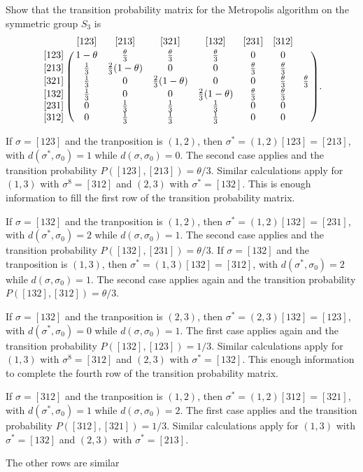 \documentclass[12pt]{article}
\begin{document}
\begin{exercise}
    Show that the transition probability matrix for the Metropolis
    algorithm on the symmetric group \( S_3 \) is
    \[
        \bordermatrix{ & [123] & [213] & [321] & [132] & [231] & [312]
        \cr
        [123] & 1-\theta & \frac{\theta}{3} & \frac{\theta}{3} & \frac{\theta}
        {3} & 0 & 0 \cr
        [213] & \frac{1}{3} & \frac{2}{3}(1-\theta) & 0 & 0 & \frac{\theta}
        {3} & \frac {\theta}{3} \cr
        [321] & \frac{1}{3} & 0 & \frac{2}{3}(1-\theta) & 0 & 0 & \frac{\theta}
        {3} & \frac{\theta}{3} \cr
        [132] & \frac{1}{3} & 0 & 0 & \frac{2}{3}(1-\theta) & \frac{\theta}
        {3} & \frac{\theta}{3} \cr
        [231] & 0 & \frac{1}{3} & \frac{1}{3} & \frac{1}{3} & 0 & 0 \cr
        [312] & 0 & \frac{1}{3} & \frac{1}{3} & \frac{1}{3} & 0 & 0 \cr
        }.
    \]
\end{exercise}
\begin{solution}
    If \( \sigma = [123] \) and the tranposition is \( (1,2) \), then \(
    \sigma^{*} = (1,2)[123] = [213] \), with \( d(\sigma^{*}, \sigma_0)
    = 1 \) while \( d(\sigma,\sigma_0) = 0 \).  The second case applies
    and the transition probability \( P([123], [213]) = \theta/3 \).
    Similar calculations apply for \( (1,3) \) with \( \sigma^8 = [312] \)
    and \( (2,3) \) with \( \sigma^* = [132] \).  This is enough
    information to fill the first row of the transition probability
    matrix.

    If \( \sigma = [132] \) and the tranposition is \( (1,2) \), then \(
    \sigma^{*} = (1,2)[132] = [231] \), with \( d(\sigma^{*}, \sigma_0)
    = 2 \) while \( d(\sigma,\sigma_0) = 1 \).  The second case applies
    and the transition probability \( P([132], [231]) = \theta/3 \). If \(
    \sigma = [132] \) and the tranposition is \( (1,3) \), then \(
    \sigma^{*} = (1,3)[132] = [312] \), with \( d(\sigma^{*}, \sigma_0)
    = 2 \) while \( d(\sigma,\sigma_0) = 1 \).  The second case applies
    again and the transition probability \( P([132], [312]) = \theta/3 \).

    If \( \sigma = [132] \) and the tranposition is \( (2,3) \), then \(
    \sigma^{*} = (2,3)[132] = [123] \), with \( d(\sigma^{*}, \sigma_0)
    = 0 \) while \( d(\sigma,\sigma_0) = 1 \).  The first case applies
    again and the transition probability \( P([132], [123]) = 1/3 \).
    Similar calculations apply for \( (1,3) \) with \( \sigma^8 = [312] \)
    and \( (2,3) \) with \( \sigma^* = [132] \).  This enough
    information to complete the fourth row of the transition probability
    matrix.

    If \( \sigma = [312] \) and the tranposition is \( (1,2) \), then \(
    \sigma^{*} = (1,2)[312] = [321] \), with \( d(\sigma^{*}, \sigma_0)
    = 1 \) while \( d(\sigma,\sigma_0) = 2 \).  The first case applies
    and the transition probability \( P([312], [321]) = 1/3 \).  Similar
    calculations apply for \( (1,3) \) with \( \sigma^* = [132] \) and \(
    (2,3) \) with \( \sigma^* = [213] \).

    The other rows are similar
\end{solution}
\end{document}
